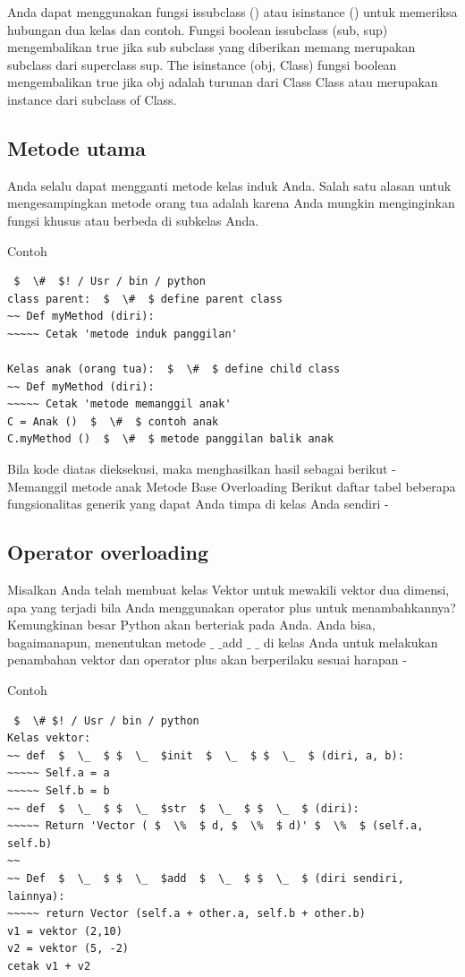 Anda dapat menggunakan fungsi issubclass () atau isinstance () untuk memeriksa hubungan dua kelas dan contoh. Fungsi boolean issubclass (sub, sup) mengembalikan true jika sub subclass yang diberikan memang merupakan subclass dari superclass sup. The isinstance (obj, Class) fungsi boolean mengembalikan true jika obj adalah turunan dari Class Class atau merupakan instance dari subclass of Class.

\subsection{Metode utama}
Anda selalu dapat mengganti metode kelas induk Anda. Salah satu alasan untuk mengesampingkan metode orang tua adalah karena Anda mungkin menginginkan fungsi khusus atau berbeda di subkelas Anda. \par
Contoh
\begin{verbatim}
 $  \#  $! / Usr / bin / python
class parent:  $  \#  $ define parent class
~~ Def myMethod (diri):
~~~~~ Cetak 'metode induk panggilan'

Kelas anak (orang tua):  $  \#  $ define child class
~~ Def myMethod (diri):
~~~~~ Cetak 'metode memanggil anak'
C = Anak ()  $  \#  $ contoh anak
C.myMethod ()  $  \#  $ metode panggilan balik anak
\end{verbatim}
Bila kode diatas dieksekusi, maka menghasilkan hasil sebagai berikut -
Memanggil metode anak
Metode Base Overloading
Berikut daftar tabel beberapa fungsionalitas generik yang dapat Anda timpa di kelas Anda sendiri -

\subsection{Operator overloading}
Misalkan Anda telah membuat kelas Vektor untuk mewakili vektor dua dimensi, apa yang terjadi bila Anda menggunakan operator plus untuk menambahkannya? Kemungkinan besar Python akan berteriak pada Anda. Anda bisa, bagaimanapun, menentukan metode  $  \_  $ $  \_  $add $  \_  $ $  \_  $ di kelas Anda untuk melakukan penambahan vektor dan operator plus akan berperilaku sesuai harapan - \par
Contoh

\begin{verbatim}
 $  \# $! / Usr / bin / python
Kelas vektor:
~~ def  $  \_  $ $  \_  $init  $  \_  $ $  \_  $ (diri, a, b):
~~~~~ Self.a = a
~~~~~ Self.b = b
~~ def  $  \_  $ $  \_  $str  $  \_  $ $  \_  $ (diri):
~~~~~ Return 'Vector ( $  \%  $ d, $  \%  $ d)' $  \%  $ (self.a, self.b)
~~
~~ Def  $  \_  $ $  \_  $add  $  \_  $ $  \_  $ (diri sendiri, lainnya):
~~~~~ return Vector (self.a + other.a, self.b + other.b)
v1 = vektor (2,10)
v2 = vektor (5, -2)
cetak v1 + v2
\end{verbatim}

